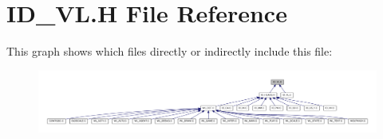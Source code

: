 \hypertarget{ID__VL_8H}{
\section{ID\_\-VL.H File Reference}
\label{ID__VL_8H}
}
This graph shows which files directly or indirectly include this file:
\nopagebreak
\begin{figure}[H]
\begin{center}
\leavevmode
\includegraphics[width=400pt]{ID__VL_8H__dep__incl}
\end{center}
\end{figure}

